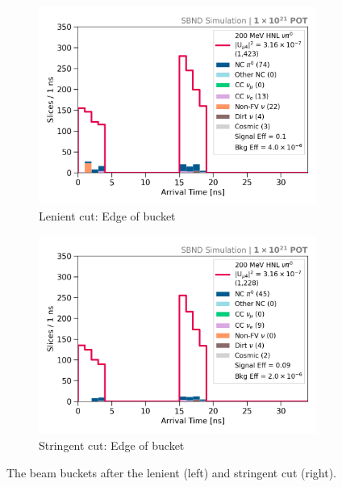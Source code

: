 \begin{figure}[htbp!]
\begin{subfigure}[b]{0.495\textwidth}
            \centering 
	    \includegraphics[width=\textwidth]{bb_lenient_edge}
            \caption{Lenient cut: Edge of bucket}%
	    \label{fig:bb_edge_loose}
        \end{subfigure}
        \hfill
        \begin{subfigure}[b]{0.495\textwidth}   
            \centering 
	    \includegraphics[width=\textwidth]{bb_stringent_edge}
            \caption{Stringent cut: Edge of bucket}%
	    \label{fig:bb_edge_strict}
        \end{subfigure}
	\caption[Beam Bucket Distributions After Selection]{
		The beam buckets after the lenient (left) and stringent cut (right).
	}
        \label{fig:timing_cut}

\end{figure}
